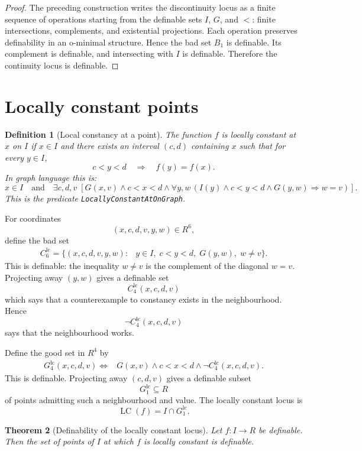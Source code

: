 \documentclass[11pt]{article}
\newtheorem{definition}{Definition}[section]
\newtheorem{theorem}[definition]{Theorem}
\newcommand{\LC}{\operatorname{LC}}
\begin{document}
\begin{proof}
The preceding construction writes the discontinuity locus as a finite sequence of operations starting from the definable sets $I$, $G$, and $<$: finite intersections, complements, and existential projections. Each operation preserves definability in an o-minimal structure. Hence the bad set $B_1$ is definable. Its complement is definable, and intersecting with $I$ is definable. Therefore the continuity locus is definable.
\end{proof}

\section{Locally constant points}

\begin{definition}[Local constancy at a point]
The function $f$ is locally constant at $x$ on $I$ if $x\in I$ and there exists an interval $(c,d)$ containing $x$ such that for every $y\in I$,
\[
  c<y<d\quad\Longrightarrow\quad f(y)=f(x).
\]
In graph language this is:
\[
  x\in I\quad\text{and}\quad
  \exists c,d,v\;[G(x,v)\land c<x<d\land
  \forall y,w\,(I(y)\land c<y<d\land G(y,w)\Rightarrow w=v)].
\]
This is the predicate \texttt{LocallyConstantAtOnGraph}.
\end{definition}

For coordinates
\[
  (x,c,d,v,y,w)\in R^6,
\]
define the bad set
\[
\begin{aligned}
  C^{\mathrm{lc}}_6=\{(x,c,d,v,y,w):{}& y\in I,
  \;c<y<d,
  \;G(y,w),
  \;w\ne v\}.
\end{aligned}
\]
This is definable: the inequality $w\ne v$ is the complement of the diagonal $w=v$.
Projecting away $(y,w)$ gives a definable set
\[
  C^{\mathrm{lc}}_4(x,c,d,v)
\]
which says that a counterexample to constancy exists in the neighbourhood.
Hence
\[
  \neg C^{\mathrm{lc}}_4(x,c,d,v)
\]
says that the neighbourhood works.

Define the good set in $R^4$ by
\[
\begin{aligned}
  G^{\mathrm{lc}}_4(x,c,d,v)
  \Longleftrightarrow{}& G(x,v)\land c<x<d\land
  \neg C^{\mathrm{lc}}_4(x,c,d,v).
\end{aligned}
\]
This is definable. Projecting away $(c,d,v)$ gives a definable subset
\[
  G^{\mathrm{lc}}_1\subseteq R
\]
of points admitting such a neighbourhood and value. The locally constant locus is
\[
  \LC(f)=I\cap G^{\mathrm{lc}}_1.
\]

\begin{theorem}[Definability of the locally constant locus]
Let $f:I\to R$ be definable. Then the set of points of $I$ at which $f$ is locally constant is definable.
\end{theorem}
\end{document}
